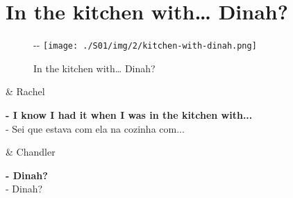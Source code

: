\hypertarget{in-the-kitchen-with-dinah}{%
\section{In the kitchen with\ldots{}
Dinah?}\label{in-the-kitchen-with-dinah}}

\begin{figure}[!ht]
  \begin{adjustwidth}{-\oddsidemargin-1in}{-\rightmargin}
    \centering
    \texttt{[image: ./S01/img/2/kitchen-with-dinah.png]}
    \caption{In the kitchen with… Dinah?\label{fig:in-the-kitchen-with-dinah}}
  \end{adjustwidth}
\end{figure}

\begin{tcolorbox}[enhanced,center upper,
    drop fuzzy shadow southeast, boxrule=0.3pt,
    lower separated=false,
    colframe=black!30!dialogoBorder,colback=white]
\begin{minipage}[c]{0.16\linewidth}
   & \centering \scriptsize{Rachel}
\end{minipage}
\hfill
\begin{minipage}[c]{0.8\linewidth}
  \textbf{- I know I had it when I was in the kitchen with...}\\
  - Sei que estava com ela na cozinha com...
\end{minipage}

\medskip
\begin{minipage}[c]{0.16\linewidth}
   & \centering \scriptsize{Chandler}
\end{minipage}
\hfill
\begin{minipage}[c]{0.8\linewidth}
  \textbf{- Dinah?}\\
  - Dinah?
\end{minipage}
\end{tcolorbox}

